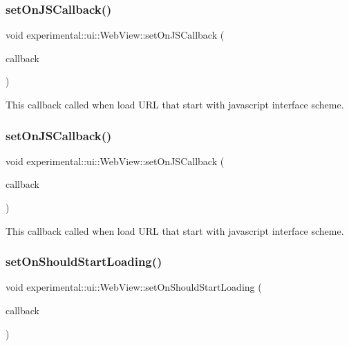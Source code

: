 \subsubsection{\texorpdfstring{set\+On\+J\+S\+Callback()}{setOnJSCallback()}\hspace{0.1cm}{\footnotesize\ttfamily [1/2]}}
{\footnotesize\ttfamily void experimental\+::ui\+::\+Web\+View\+::set\+On\+J\+S\+Callback (\begin{DoxyParamCaption}\item[{const \hyperlink{classexperimental_1_1ui_1_1WebView_a11ddd376a5996eff614857f236b2b69d}{cc\+Web\+View\+Callback} \&}]{callback }\end{DoxyParamCaption})}

This callback called when load U\+RL that start with javascript interface scheme. \mbox{\label{classexperimental_1_1ui_1_1WebView_a434bac1a0a15294300ada912b85c35f4}} 
\subsubsection{\texorpdfstring{set\+On\+J\+S\+Callback()}{setOnJSCallback()}\hspace{0.1cm}{\footnotesize\ttfamily [2/2]}}
{\footnotesize\ttfamily void experimental\+::ui\+::\+Web\+View\+::set\+On\+J\+S\+Callback (\begin{DoxyParamCaption}\item[{const \hyperlink{classexperimental_1_1ui_1_1WebView_a11ddd376a5996eff614857f236b2b69d}{cc\+Web\+View\+Callback} \&}]{callback }\end{DoxyParamCaption})}

This callback called when load U\+RL that start with javascript interface scheme. \mbox{\label{classexperimental_1_1ui_1_1WebView_a212732b5b2ec9bd73084c57a140b5dd8}} 
\subsubsection{\texorpdfstring{set\+On\+Should\+Start\+Loading()}{setOnShouldStartLoading()}\hspace{0.1cm}{\footnotesize\ttfamily [1/2]}}
{\footnotesize\ttfamily void experimental\+::ui\+::\+Web\+View\+::set\+On\+Should\+Start\+Loading (\begin{DoxyParamCaption}\item[{const std\+::function$<$ bool(\hyperlink{classexperimental_1_1ui_1_1WebView}{Web\+View} $\ast$sender, const std\+::string \&url)$>$ \&}]{callback }\end{DoxyParamCaption})}

